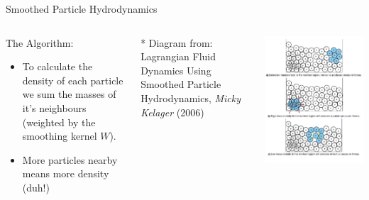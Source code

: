 \documentclass[12pt]{beamer}
\begin{document}
\begin{frame}[t]{Smoothed Particle Hydrodynamics}

\begin{columns}
\begin{block}{The Algorithm:}
\begin{itemize}

\item To calculate the density of each particle we sum the masses of it's neighbours \pause (weighted by the smoothing kernel $W$). \pause
\item More particles nearby means more density \pause (duh!)

\end{itemize}
\end{block}
\pause

\color{white}
\tiny{* Diagram from: Lagrangian Fluid Dynamics 
Using Smoothed Particle Hydrodynamics, \textit{Micky Kelager} (2006) }



\includegraphics[scale=0.40]{SPH-Theory}

\end{columns}

\end{frame}
\end{document}
